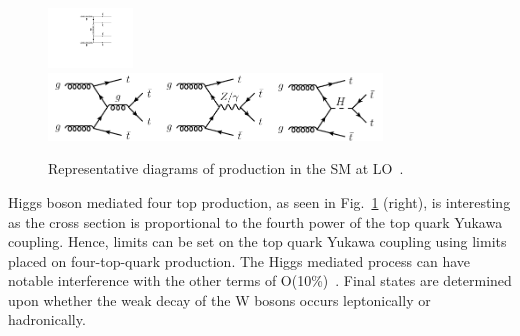 


\begin{figure}[ht!]
\begin{center}
    \includegraphics[width=0.2\textwidth]{images/Theory/tttt_t_LO.pdf}
        \includegraphics[width=0.79\textwidth]{images/Theory/tttt_feyn_X.png}

    \caption{Representative diagrams of \tttt production in the SM at LO~\cite{Cao:2016wib}.}
    \label{fig:ttttAtLO}
\end{center}
\end{figure}
Higgs boson mediated four top production, as seen in Fig.~\ref{fig:ttttAtLO} (right), is interesting as the cross section is proportional to the fourth power of the top quark Yukawa coupling. Hence, limits can be set on the top quark Yukawa coupling using limits placed on four-top-quark production. The Higgs mediated process can have notable interference with the other terms of O(10\%)~\cite{Cao:2016wib}.
Final states are determined upon whether the weak decay of the W bosons occurs leptonically or hadronically. 

